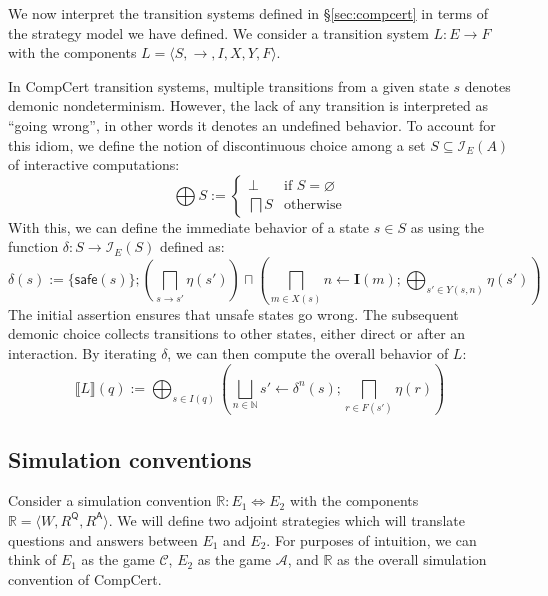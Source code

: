 \documentclass[format=sigplan,authordraft]{acmart}
\newcommand{\kw}[1]{\ensuremath{ \mathsf{#1} }}
\begin{document}
We now interpret the transition systems defined in \S\ref{sec:compcert}
in terms of the strategy model we have defined.
We consider a transition system $L : E \rightarrow F$
with the components $L = \langle S, {\rightarrow}, I, X, Y, F \rangle$.

In CompCert transition systems,
multiple transitions from a given state $s$
denotes demonic nondeterminism.
However,
the lack of any transition is interpreted as ``going wrong'',
in other words it denotes an undefined behavior.
To account for this idiom,
we define the notion of discontinuous choice among
a set $S \subseteq \mathcal{I}_E(A)$ of interactive computations:
\[
    \bigoplus S :=
    \begin{cases}
      \bot & \mbox{if } S = \varnothing \\
      \bigsqcap S & \mbox{otherwise}
    \end{cases}
\]
With this,
we can define the immediate behavior of a state $s \in S$ as
using the function $\delta : S \rightarrow \mathcal{I}_E(S)$
defined as:
\[
  \delta(s) :=
    \{ \kw{safe}(s) \} ;
    \left( \bigsqcap_{s \rightarrow s'} \eta(s') \right)
    \sqcap
    \left( \bigsqcap_{m \in X(s)} n \leftarrow \mathbf{I}(m) ;
            \bigoplus_{s' \in Y(s, n)} \eta(s') \right)
\]
The initial assertion ensures that unsafe states go wrong.
The subsequent demonic choice
collects transitions to other states,
either direct or after an interaction.
By iterating $\delta$, we can then compute the overall behavior of $L$:
\[
   \llbracket L \rrbracket (q) :=
     \bigoplus_{s \in I(q)}
     \left(
     \bigsqcup_{n \in \mathbb{N}}
     s' \leftarrow \delta^n(s) ; \bigsqcap_{r \in F(s')} \eta(r)
     \right)
\]


\subsection{Simulation conventions} %

Consider a simulation convention $\mathbb{R} : E_1 \Leftrightarrow E_2$
with the components $\mathbb{R} = \langle W, R^\kw{Q}, R^\kw{A} \rangle$.
We will define two adjoint strategies
which will translate questions and answers between
$E_1$ and $E_2$.
For purposes of intuition,
we can think of $E_1$ as the game $\mathcal{C}$,
$E_2$ as the game $\mathcal{A}$,
and $\mathbb{R}$ as the overall simulation convention of CompCert.
\end{document}
